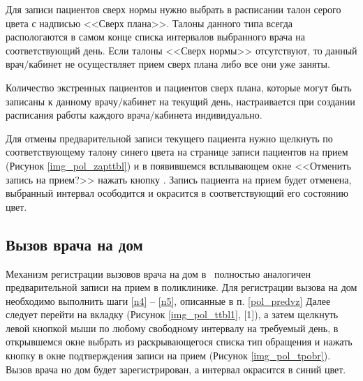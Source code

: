 Для записи пациентов сверх нормы нужно выбрать в расписании талон серого цвета с надписью <<Сверх плана>>. Талоны данного типа всегда распологаются в самом конце списка интервалов выбранного врача на соответствующий день. Если талоны <<Сверх нормы>> отсутствуют, то данный врач$\slash$кабинет не осуществляет прием сверх плана либо все они уже заняты. 

\begin{prim}
Количество экстренных пациентов и пациентов сверх плана, которые могут быть записаны к данному врачу$\slash$кабинет на текущий день, настраивается при создании расписания работы каждого врача$\slash$кабинета индивидуально. 
\end{prim}

Для отмены предварительной записи текущего пациента нужно щелкнуть по соответствующему талону синего цвета на странице записи пациентов на прием (Рисунок \ref{img_pol_zapttbl}) и в появившемся всплывающем окне <<Отменить запись на прием?>> нажать кнопку . Запись пациента на прием будет отменена, выбранный интервал осободится и окрасится в соответствующий его состоянию цвет.

\subsection{Вызов врача на дом} \label{pol_home}

Механизм регистрации вызовов врача на дом в \tmis~полностью аналогичен предварительной записи на прием в поликлинике. Для регистрации вызова на дом необходимо выполнить шаги \ref{n4} -- \ref{n5}, описанные в п. \ref{pol_predvz} Далее следует перейти на вкладку  (Рисунок \ref{img_pol_ttbl1}, [1]), а затем щелкнуть левой кнопкой мыши по любому свободному интервалу на требуемый день, в открывшемся окне выбрать из раскрывающегося списка тип обращения и нажать кнопку  в окне подтверждения записи на прием (Рисунок \ref{img_pol_tpobr}). Вызов врача но дом будет зарегистрирован, а интервал окрасится в синий цвет.
